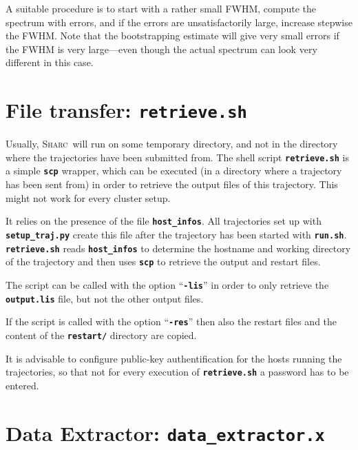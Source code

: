 \documentclass[a4paper,10pt,DIV=15,openany]{scrbook}
\newcommand{\sharc}{\textsc{Sharc}}
\newcommand{\ttt}[1]{\textbf{\texttt{#1}}}
\begin{document}
A suitable procedure is to start with a rather small FWHM, compute the spectrum with errors, and if the errors are unsatisfactorily large, increase stepwise the FWHM.
Note that the bootstrapping estimate will give very small errors if the FWHM is very large---even though the actual spectrum can look very different in this case.



\section{File transfer: \ttt{retrieve.sh}}\label{sec:retrieve}

Usually, \sharc\ will run on some temporary directory, and not in the directory where the trajectories have been submitted from. The shell script \ttt{retrieve.sh} is a simple \ttt{scp} wrapper, which can be executed (in a directory where a trajectory has been sent from) in order to retrieve the output files of this trajectory. This might not work for every cluster setup.

It relies on the presence of the file \ttt{host\_infos}. All trajectories set up with \ttt{setup\_traj.py} create this file after the trajectory has been started with \ttt{run.sh}. \ttt{retrieve.sh} reads \ttt{host\_infos} to determine the hostname and working directory of the trajectory and then uses \ttt{scp} to retrieve the output and restart files.

The script can be called with the option ``\ttt{-lis}'' in order to only retrieve the \ttt{output.lis} file, but not the other output files.

If the script is called with the option ``\ttt{-res}'' then also the restart files and the content of the \ttt{restart/} directory are copied.

It is advisable to configure public-key authentification for the hosts running the trajectories, so that not for every execution of \ttt{retrieve.sh} a password has to be entered.











\section{Data Extractor: \ttt{data\_extractor.x}}\label{sec:data_extractor.x}
\end{document}
